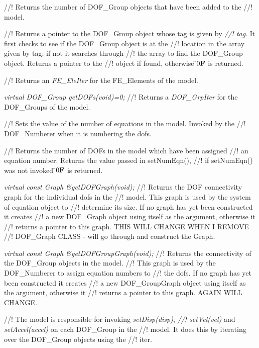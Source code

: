 //! Returns the number of DOF\_Group objects that have been added to the
//! model.

//! Returns a pointer to the DOF\_Group object whose tag is given by {\em
//! tag}.  It first checks to see if the DOF\_Group object is at the
//! location in the array given by \p tag; if not it searches through
//! the array to find the DOF\_Group object. Returns a pointer to the
//! object if found, otherwise \f$0{\bf F}$ is returned.

//! Returns an {\em FE\_EleIter} for the FE\_Elements of the model.

{\em virtual DOF\_Group getDOFs(void)=0;}
//! Returns a {\em DOF\_GrpIter} for the DOF\_Groups of the model.

//! Sets the value of the number of equations in the model. Invoked by the
//! DOF\_Numberer when it is numbering the dofs.

//! Returns the number of DOFs in the model which have been assigned
//! an equation number. Returns the value passed in setNumEqn(),
//! if setNumEqn() was not invoked \f$0{\bf F}$ is returned.

{\em virtual const Graph \&getDOFGraph(void);}
//! Returns the DOF connectivity graph for the individual dofs in the
//! model. This graph is used by the system of equation object to
//! determine its size. If no graph has yet been constructed it creates
//! a new DOF\_Graph object using itself as the argument, otherwise it
//! returns a pointer to this graph. THIS WILL CHANGE WHEN I REMOVE
//! DOF\_Graph CLASS - will go through and construct the Graph.

{\em virtual const Graph \&getDOFGroupGraph(void);}
//! Returns the connectivity of the DOF\_Group objects in the model. 
//! This graph is used by the DOF\_Numberer to assign equation numbers to
//! the dofs. If no graph has yet been constructed it creates
//! a new DOF\_GroupGraph object using itself as the argument, otherwise it
//! returns a pointer to this graph. AGAIN WILL CHANGE.

//! The model is responsible for invoking {\em setDisp(disp)}, {\em
//! setVel(vel)} and {\em setAccel(accel)} on each DOF\_Group in the
//! model. It does this by iterating over the DOF\_Group objects using the
//! iter.


